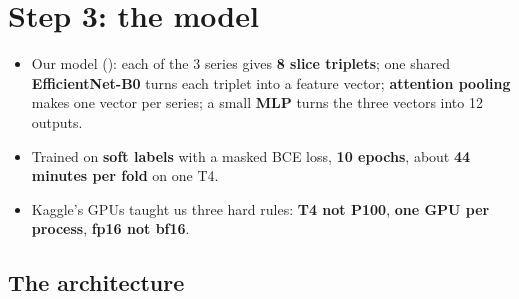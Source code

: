 \chapter{Step 3: the model}
\label{ch:model}

\begin{tldr}
\begin{itemize}
\item Our model (): each of the 3 series gives \textbf{8 slice triplets}; one shared \textbf{EfficientNet-B0}
      turns each triplet into a feature vector; \textbf{attention pooling} makes one vector per series; a small
      \textbf{MLP} turns the three vectors into 12 outputs.
\item Trained on \textbf{soft labels} with a masked BCE loss, \textbf{10 epochs}, about \textbf{44 minutes per fold} on one T4.
\item Kaggle's GPUs taught us three hard rules: \textbf{T4 not P100}, \textbf{one GPU per process}, \textbf{fp16 not bf16}.
\end{itemize}
\end{tldr}

\section{The architecture}

